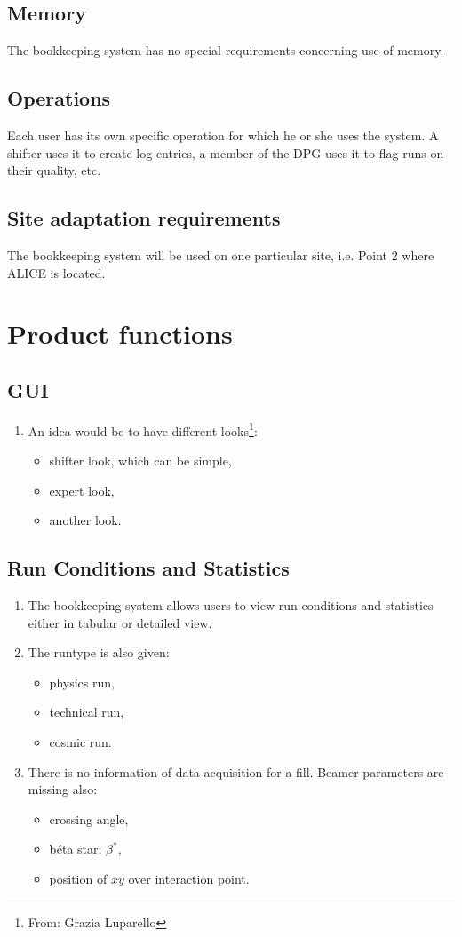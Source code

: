 \subsection{Memory}
The bookkeeping system has no special requirements concerning use of memory.

\subsection{Operations}
Each user has its own specific operation for which he or she uses the system. A shifter uses it to create log entries, a member of the DPG uses it to flag runs on their quality, etc.

\subsection{Site adaptation requirements}
The bookkeeping system will be used on one particular site, i.e. Point 2 where ALICE is located.

\section{Product functions}
\subsection{GUI}
\begin{enumerate}
  \item An idea would be to have different looks\footnote{From: Grazia Luparello}:
  \begin{itemize}
    \item shifter look, which can be simple,
    \item expert look,
    \item another look.
  \end{itemize}
\end{enumerate}
\subsection{Run Conditions and Statistics}
\begin{enumerate}
  \item The bookkeeping system allows users to view run conditions and statistics either in tabular or detailed view.
  \item The runtype is also given:
  \begin{itemize}
    \item physics run,
    \item technical run,
    \item cosmic run.
  \end{itemize}
  \item There is no information of data acquisition for a fill. Beamer parameters are missing also:
  \begin{itemize}
    \item crossing angle,
    \item b\'eta star: $\beta^*$,
    \item position of $xy$ over interaction point.
  \end{itemize}
\end{enumerate}
